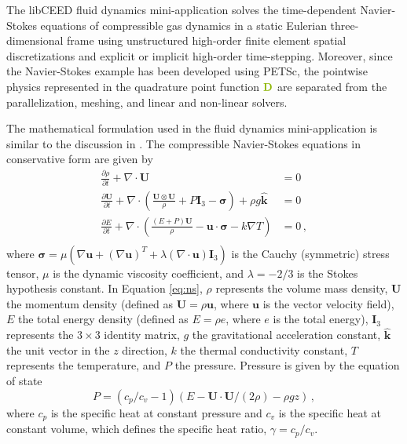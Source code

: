 The libCEED \cite{libceed-user-manual} fluid dynamics mini-application solves the time-dependent Navier-Stokes equations of compressible gas dynamics in a static Eulerian three-dimensional frame using unstructured high-order finite element spatial discretizations and explicit or implicit high-order time-stepping.
Moreover, since the Navier-Stokes example has been developed using PETSc, the pointwise physics represented in the quadrature point function ${\color{applegreen}\mathbf{D}}$ are separated from the parallelization, meshing, and linear and non-linear solvers.

The mathematical formulation used in the fluid dynamics mini-application is similar to the discussion in \cite{giraldoetal2010}.
The compressible Navier-Stokes equations in conservative form are given by
\begin{equation}
   \begin{aligned}
   \frac{\partial \rho}{\partial t} + \nabla \cdot \mathbf{U} &= 0 \\
   \frac{\partial \mathbf{U}}{\partial t} + \nabla \cdot \left( \frac{\mathbf{U} \otimes \mathbf{U}}{\rho} + P \mathbf{I}_3 - \mathbf\sigma \right) + \rho g \hat{\mathbf{k}} &= 0 \\
   \frac{\partial E}{\partial t} + \nabla \cdot \left( \frac{(E + P)\mathbf{U}}{\rho} -\mathbf{u} \cdot \mathbf{\sigma} - k \nabla T \right) &= 0 \, , \\
   \end{aligned}
\label{eq:ns}
\end{equation}
where $\boldsymbol{\sigma} = \mu \left( \nabla \mathbf{u} + \left( \nabla \mathbf{u} \right)^T + \lambda \left( \nabla \cdot \mathbf{u} \right) \mathbf{I}_3 \right)$ is the Cauchy (symmetric) stress tensor, $\mu$ is the dynamic viscosity coefficient, and $\lambda = - 2/3$ is the Stokes hypothesis constant.
In Equation \ref{eq:ns}, $\rho$ represents the volume mass density, $\mathbf{U}$ the momentum density (defined as $\mathbf{U} = \rho \mathbf{u}$, where $\mathbf{u}$ is the vector velocity field), $E$ the total energy density (defined as $E = \rho e$, where $e$ is the total energy), $\mathbf{I}_3$ represents the $3 \times 3$ identity matrix, $g$ the gravitational acceleration constant, $\mathbf{\hat{k}}$ the unit vector in the $z$ direction, $k$ the thermal conductivity constant, $T$ represents the temperature, and $P$ the pressure.
Pressure is given by the equation of state
\begin{equation}
   P = \left( {c_p}/{c_v} -1\right) \left( E - {\mathbf{U} \cdot \mathbf{U}}/{(2 \rho)} - \rho g z \right) \, ,
   \label{eq:ns_state}
\end{equation}
where $c_p$ is the specific heat at constant pressure and $c_v$ is the specific heat at constant volume, which defines the specific heat ratio, $\gamma = c_p / c_v$.

